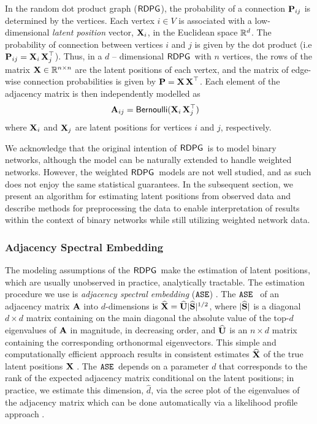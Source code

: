 In the random dot product graph ($\rdpg$), the probability of a connection $\P_{ij}$ is determined by the vertices. Each vertex $i\in V$ is associated with a low-dimensional \textit{latent position} vector, $\X_i$, in the Euclidean space $\RR^d$. The probability of connection between vertices $i$ and $j$ is given by the dot product (i.e $\P_{ij} = \X_i \X_j^\top$). Thus, in a $d$ -- dimensional $\rdpg$\ with $n$ vertices, the rows of the matrix $\X\in\RR^{n\times n}$ are the latent positions of each vertex, and the matrix of edge-wise connection probabilities is given by $\P=\X\X^\top$. Each element of the adjacency matrix is then independently modelled as
\begin{align*}
    \A_{ij} &= \bern(\X_i \X_j^\top)
\end{align*}
where $\X_i$ and $\X_j$ are latent positions for vertices $i$ and $j$, respectively.

We acknowledge that the original intention of $\rdpg$\ is to model binary networks, although the model can be naturally extended to handle weighted networks. However, the weighted $\rdpg$\ models are not well studied, and as such does not enjoy the same statistical guarantees. In the subsequent section, we present an algorithm for estimating latent positions from observed data and describe methods for preprocessing the data to enable interpretation of results within the context of binary networks while still utilizing weighted network data.

\subsubsection{Adjacency Spectral Embedding}
The modeling assumptions of the $\rdpg$\ make the estimation of latent positions, which are usually unobserved in practice, analytically tractable. The estimation procedure we use is \textit{adjacency spectral embedding} ($\ase$) \cite{ase-consistency-1}. The $\ase$~ of an adjacency matrix $\A$ into $d$-dimensions is $\hatX = \hatU|{\hatS}|^{1/2}$, where $|\hatS|$ is a diagonal $d \times d$ matrix containing on the main diagonal the absolute value of the top-$d$ eigenvalues of $\A$ in magnitude, in decreasing order, and $\hatU$ is an $n\times d$ matrix containing the corresponding orthonormal eigenvectors. This simple and computationally efficient approach results in consistent estimates $\hatX$  of the true latent positions $\X$ \cite{ase-consistency-1,ase-consistency-2, ase-consistency-3}. The $\ase$\ depends on a parameter $d$ that corresponds to the rank of the expected adjacency matrix conditional on the latent positions; in practice, we estimate this dimension, $\hat d$, via the scree plot of the eigenvalues of the adjacency matrix which can be done automatically via a likelihood profile approach \cite{zhu2006automatic}.


